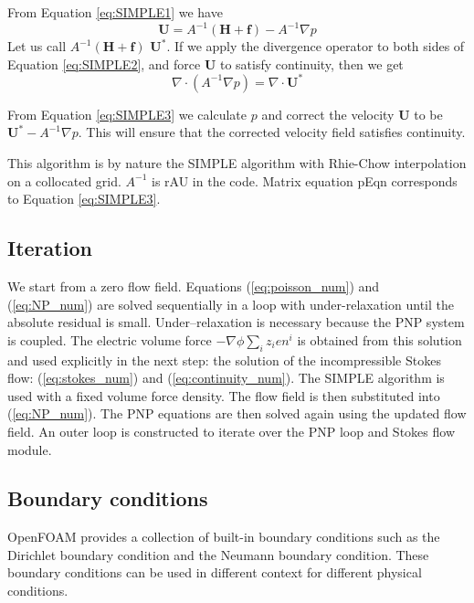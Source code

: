 From Equation \ref{eq:SIMPLE1} we have 
\begin{equation}
\mathbf{U} = A^{-1}(\mathbf{H}+\mathbf{f}) - A^{-1}\nabla p
\label{eq:SIMPLE2}
\end{equation}
Let us call $A^{-1}(\mathbf{H}+\mathbf{f})$ $\mathbf{U}^*$. If we apply the divergence operator to both sides of Equation \ref{eq:SIMPLE2}, and force $\mathbf{U}$ to satisfy continuity, then we get
\begin{equation}
\nabla \cdot \left(A^{-1}\nabla p\right) = \nabla \cdot \mathbf{U}^*
\label{eq:SIMPLE3}
\end{equation}

From Equation \ref{eq:SIMPLE3} we calculate $p$ and correct the velocity $\mathbf{U}$ to be $\mathbf{U}^* - A^{-1}\nabla p$. This will ensure that the corrected velocity field satisfies continuity.

This algorithm is by nature the SIMPLE algorithm with Rhie-Chow interpolation on a collocated grid. $A^{-1}$ is \textsf{rAU} in the code. Matrix equation \textsf{pEqn} corresponds to Equation \ref{eq:SIMPLE3}.

\subsection{Iteration}
We start from a zero flow field. Equations  (\ref{eq:poisson_num}) and (\ref{eq:NP_num}) are solved sequentially in a loop with under-relaxation until the absolute residual is small. Under--relaxation is necessary because the PNP system is coupled. The electric volume force $- \nabla \phi\sum_i z_ien^i $ is obtained from this solution and used explicitly in the next step: the solution of the incompressible Stokes flow: (\ref{eq:stokes_num}) and (\ref{eq:continuity_num}). The SIMPLE algorithm is used with a fixed volume force density. The flow field is then substituted into (\ref{eq:NP_num}). The PNP equations are then solved again using the updated flow field. An outer loop is constructed to iterate over the PNP loop and Stokes flow module.

\subsection{Boundary conditions}
OpenFOAM provides a collection of built-in boundary conditions such as the Dirichlet boundary condition and the Neumann boundary condition. These boundary conditions can be used in different context for different physical conditions.

